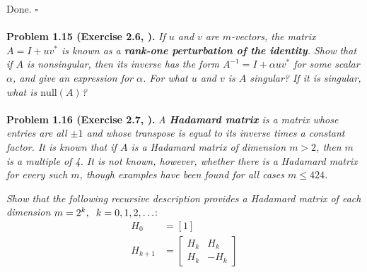 \documentclass[a4paper,oneside]{book}
\numberwithin{equation}{chapter}
\begin{document}
Done. \hfill $\square$\\
\\
\textbf{Problem 1.15 (Exercise 2.6, \cite{1}).} \textit{If $u$ and $v$ are $m$-vectors, the matrix $A=I+uv^*$ is known as a \textbf{rank-one perturbation of the identity}. Show that if $A$ is nonsingular, then its inverse has the form $A^{-1}=I+\alpha uv^*$ for some scalar $\alpha$, and give an expression for $\alpha$. For what $u$ and $v$ is $A$ singular? If it is singular, what is $\mbox{null}\left(A\right)$?}\\
\\
\textbf{Problem 1.16 (Exercise 2.7, \cite{1}).} \textit{A \textbf{Hadamard matrix} is a matrix whose entries are all $\pm 1$ and whose transpose is equal to its inverse times a constant factor. It is known that if $A$ is a Hadamard matrix of dimension $m>2$, then $m$ is a multiple of 4. It is not known, however, whether there is a Hadamard matrix for every such $m$, though examples have been found for all cases $m\le 424$.}

\textit{Show that the following recursive description provides a Hadamard matrix of each dimension $m=2^k,\hspace{0.2cm}k=0,1,2,\ldots$}:
\begin{align}
{H_0} &= \left[ 1 \right]\\
{H_{k + 1}} &= \left[ {\begin{array}{*{20}{c}}
{{H_k}}&{{H_k}}\\
{{H_k}}&{ - {H_k}}
\end{array}} \right]
\end{align}
\end{document}
